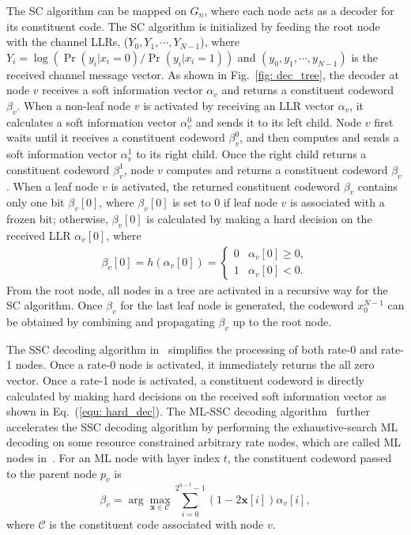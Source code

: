 \documentclass[journal]{IEEEtran}
\begin{document}
The SC algorithm can be mapped on $G_n$, where each node acts as a decoder for its constituent code. The SC algorithm is initialized by feeding the root node with the channel LLRs, ($Y_0, Y_1, \cdots, Y_{N-1}$), where $Y_i = \log(\Pr(y_i|x_i=0)/\Pr(y_i|x_i=1))$ and $(y_0,y_1,\cdots,y_{N-1})$ is the received channel message vector. As shown in Fig.~\ref{fig: dec_tree}, the decoder at node $v$ receives a soft information vector $\alpha_v$ and returns a constituent codeword $\beta_v$. When a non-leaf node $v$ is activated by receiving an LLR vector $\alpha_v$, it calculates a soft information vector $\alpha_{v}^0$ and sends it to its left child.
Node $v$ first waits until it receives a constituent codeword $\beta_v^0$, and then computes and sends a soft information vector $\alpha_v^1$ to its right child.
Once the right child returns a constituent codeword $\beta_v^1$, node $v$ computes and returns a constituent codeword $\beta_v$.
When a leaf node $v$ is activated, the returned constituent codeword $\beta_v$ contains only one bit $\beta_v[0]$, where $\beta_v[0]$ is set to 0 if leaf node $v$ is associated with a frozen bit; otherwise, $\beta_v[0]$ is calculated by making a hard decision on the received LLR $\alpha_v[0]$, where
\begin{eqnarray}\label{equ: hard_dec}
 \beta_v[0] = h(\alpha_v[0])= \left\{ \begin{array}{ll}
 0 & \alpha_v[0] \geqslant 0,\\
1 & \alpha_v[0] < 0.
 \end{array} \right.
\end{eqnarray}
From the root node, all nodes in a tree are activated in a recursive way for the SC algorithm. Once $\beta_v$ for the last leaf node is generated, the codeword $x_0^{N-1}$ can be obtained by combining and propagating $\beta_v$ up to the root node.

The SSC decoding algorithm in~\cite{low_latency_polar} simplifies the processing of both rate-0 and rate-1 nodes. Once a rate-0 node is activated, it immediately returns the all zero vector. Once a rate-1 node is activated, a constituent codeword is directly calculated by making hard decisions on the received soft information vector as shown in Eq.~(\ref{equ: hard_dec}). The ML-SSC decoding algorithm~\cite{ml_ssc} further accelerates the SSC decoding algorithm by performing the exhaustive-search ML decoding on some resource constrained arbitrary rate nodes, which are called ML nodes in~\cite{ml_ssc}. For an ML node with layer index $t$, the constituent codeword passed to the parent node $p_v$ is
\begin{equation}\label{equ: mld}
\beta_v = \arg\!\max_{\textbf{x}\in \mathcal{C}}\sum_{i=0}^{2^{n-t}-1}(1-2\textbf{x}[i])\alpha_v[i],
\end{equation}
where $\mathcal{C}$ is the constituent code associated with node $v$.
\end{document}
